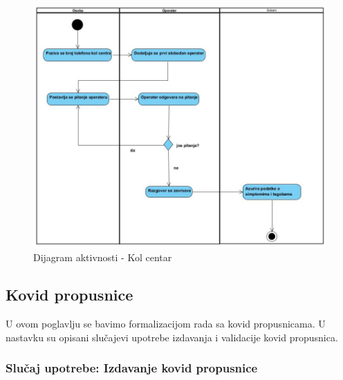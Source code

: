 \documentclass[titlepage]{article}
\begin{document}
\begin{figure}[H]
\includegraphics[width=\textwidth,height=\textheight,keepaspectratio]{Kol_centar}
\caption{Dijagram aktivnosti - Kol centar}
\end{figure}

\subsection{Kovid propusnice}

U ovom poglavlju se bavimo formalizacijom rada sa kovid propusnicama. U nastavku su opisani slučajevi upotrebe izdavanja i validacije kovid propusnica.

\subsubsection{Slučaj upotrebe: Izdavanje kovid propusnice}

\end{document}
